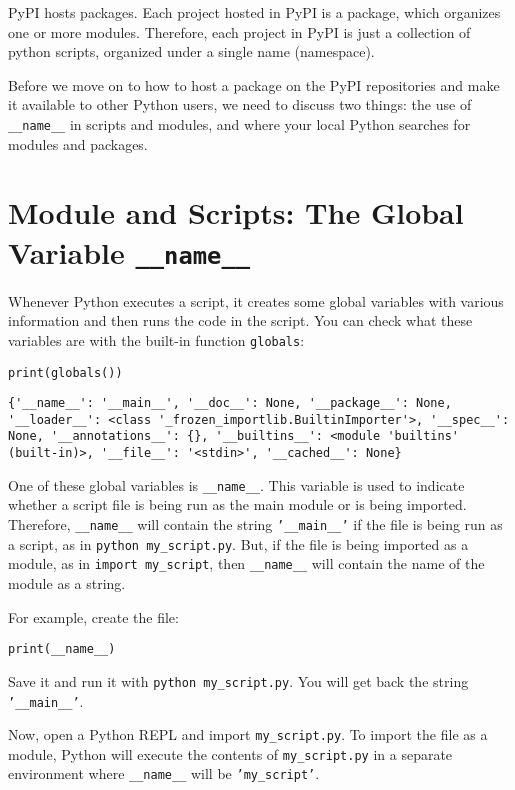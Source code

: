 \documentclass[12pt, a4paper]{article}
\begin{document}
PyPI hosts packages.
Each project hosted in PyPI is a package, which organizes one or more modules.
Therefore, each project in PyPI is just a collection of python scripts, organized under a single name (namespace).

Before we move on to how to host a package on the PyPI repositories and make it available to other Python users, we need to discuss two things: the use of \texttt{\_\_name\_\_} in scripts and modules, and where your local Python searches for modules and packages.
\section*{Module and Scripts: The Global Variable \texttt{\_\_name\_\_}}
\label{sec:org2ed7035}
Whenever Python executes a script, it creates some global variables with various information and then runs the code in the script.
You can check what these variables are with the built-in function \texttt{globals}:
\lstset{language=jupyter-python,label= ,caption= ,captionpos=b,numbers=none}
\begin{lstlisting}
print(globals())
\end{lstlisting}

\begin{verbatim}
{'__name__': '__main__', '__doc__': None, '__package__': None, '__loader__': <class '_frozen_importlib.BuiltinImporter'>, '__spec__': None, '__annotations__': {}, '__builtins__': <module 'builtins' (built-in)>, '__file__': '<stdin>', '__cached__': None}
\end{verbatim}


One of these global variables is \texttt{\_\_name\_\_}.
This variable is used to indicate whether a script file is being run as the main module or is being imported.
Therefore, \texttt{\_\_name\_\_} will contain the string \texttt{'\_\_main\_\_'} if the file is being run as a script, as in \texttt{python my\_script.py}.
But, if the file is being imported as a module, as in \texttt{import my\_script}, then \texttt{\_\_name\_\_} will contain the name of the module as a string.

For example, create the file:
\lstset{language=jupyter-python,label= ,caption= ,captionpos=b,numbers=none}
\begin{lstlisting}
print(__name__)
\end{lstlisting}
Save it and run it with \texttt{python my\_script.py}.
You will get back the string \texttt{'\_\_main\_\_'}.

Now, open a Python REPL and import \texttt{my\_script.py}.
To import the file as a module, Python will execute the contents of \texttt{my\_script.py} in a separate environment where \texttt{\_\_name\_\_} will be \texttt{'my\_script'}.
\end{document}
